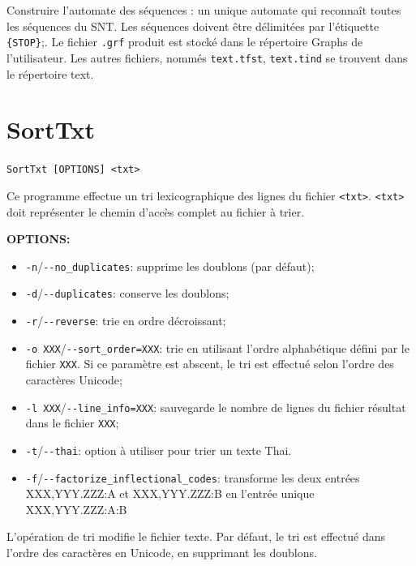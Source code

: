 \bigskip
\noindent Construire l'automate des séquences : un unique automate qui reconnaît toutes les séquences du SNT. Les  séquences doivent être  délimitées par l'étiquette \verb+{STOP}+;. Le fichier
\verb+.grf+ produit est stocké dans le répertoire Graphs de l'utilisateur. Les autres fichiers,
nommés \verb+text.tfst+, \verb+text.tind+ se trouvent dans le répertoire text.

\section{SortTxt}

\verb+SortTxt [OPTIONS] <txt>+

\bigskip
\noindent Ce programme effectue un tri lexicographique des lignes du fichier
\verb+<txt>+. \verb+<txt>+ doit représenter le chemin d’accès complet au fichier à trier.


\bigskip
\noindent \textbf{OPTIONS:}
\begin{itemize}
\item \verb+-n+/\verb+--no_duplicates+: supprime les doublons (par défaut);

\item \verb+-d+/\verb+--duplicates+: conserve les doublons;

\item \verb+-r+/\verb+--reverse+: trie en ordre décroissant;

\item \verb+-o XXX+/\verb+--sort_order=XXX+: trie en utilisant l'ordre alphabétique défini par le
fichier \verb+XXX+. Si ce paramètre est abscent, le tri est effectué selon l'ordre des caractères
Unicode;

\item \verb+-l XXX+/\verb+--line_info=XXX+: sauvegarde le nombre de lignes du fichier résultat dans le fichier \verb+XXX+;
  
\item \verb+-t+/\verb+--thai+: option à utiliser pour trier un texte Thai.
\item \verb+-f+/\verb+--factorize_inflectional_codes+: transforme les deux entrées XXX,YYY.ZZZ:A et XXX,YYY.ZZZ:B en l'entrée unique  XXX,YYY.ZZZ:A:B
\end{itemize}

\bigskip
\noindent L’opération de tri modifie le fichier texte. Par défaut, le tri est effectué dans l’ordre
des caractères en Unicode, en supprimant les doublons.









